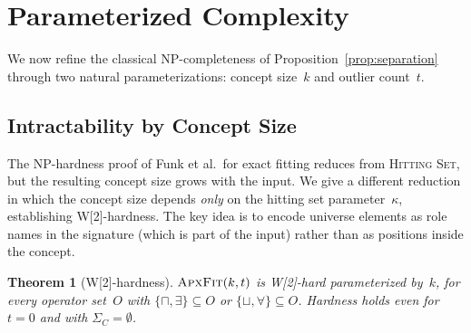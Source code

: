 \documentclass[accepted]{uai2026} %
\newtheorem{theorem}{Theorem}[section]
\theoremstyle{definition}
\theoremstyle{remark}
\newcommand{\AF}{\textsc{ApxFit}}
\begin{document}
\section{Parameterized Complexity}\label{sec:complexity}

We now refine the classical NP-completeness of
Proposition~\ref{prop:separation} through two natural
parameterizations: concept size~$k$ and outlier count~$t$.

\subsection{Intractability by Concept Size}\label{sec:complexity:hard}

The NP-hardness proof
of Funk et al.\ for exact fitting reduces
from \textsc{Hitting Set}, but the resulting concept size grows with
the input. We give a different reduction in which the concept
size depends \emph{only} on the hitting set parameter~$\kappa$,
establishing W[2]-hardness. The key idea is to encode universe
elements as role names in the signature (which
is part of the input) rather than as positions inside the concept.

\begin{theorem}[{W[2]-hardness}]\label{thm:w2hard}
  $\AF(k,t)$ is \textsf{W[2]}-hard parameterized
  by~$k$, for every operator set~$O$ with
  $\{\sqcap, \exists\} \subseteq O$ or
  $\{\sqcup, \forall\} \subseteq O$.
  Hardness holds even for $t = 0$ and with
  $\Sigma_C = \emptyset$.
\end{theorem}
\end{document}
